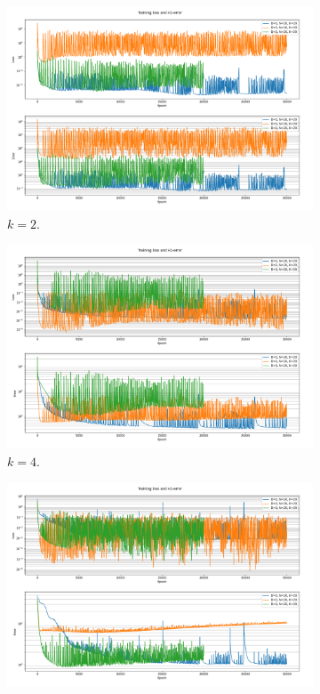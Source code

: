 \begin{figure}[h!]
    \centering
    \begin{subfigure}[b]{0.48\textwidth}
        \includegraphics[width=\textwidth]{img/VPINN-Comparison-lsinitk2.png}
        \caption{$k=2$.}
        \label{fig:vpinnslsinitk2}
    \end{subfigure}
    \hfill
    \begin{subfigure}[b]{0.48\textwidth}
        \includegraphics[width=\textwidth]{img/VPINN-Comparison-lsinitk4.png}
        \caption{$k=4$.}
        \label{fig:vpinnslsinitk4}
    \end{subfigure}
    \vfill
    \begin{subfigure}[b]{0.48\textwidth}
        \includegraphics[width=\textwidth]{img/VPINN-Comparison-lsinitk6.png}

\end{subfigure}
\end{figure}

